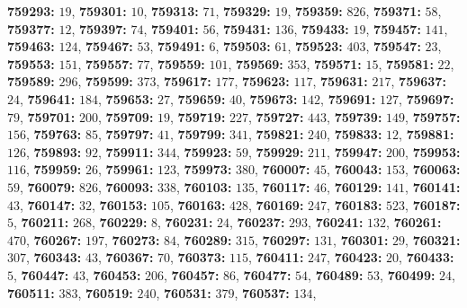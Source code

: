 \textsf{\bfseries 759293:} $19$, \textsf{\bfseries 759301:} $10$, \textsf{\bfseries 759313:} $71$, \textsf{\bfseries 759329:} $19$, \textsf{\bfseries 759359:} $826$, \textsf{\bfseries 759371:} $58$, \textsf{\bfseries 759377:} $12$, \textsf{\bfseries 759397:} $74$, \textsf{\bfseries 759401:} $56$, \textsf{\bfseries 759431:} $136$, \textsf{\bfseries 759433:} $19$, \textsf{\bfseries 759457:} $141$, \textsf{\bfseries 759463:} $124$, \textsf{\bfseries 759467:} $53$, \textsf{\bfseries 759491:} $6$, \textsf{\bfseries 759503:} $61$, \textsf{\bfseries 759523:} $403$, \textsf{\bfseries 759547:} $23$, \textsf{\bfseries 759553:} $151$, \textsf{\bfseries 759557:} $77$, \textsf{\bfseries 759559:} $101$, \textsf{\bfseries 759569:} $353$, \textsf{\bfseries 759571:} $15$, \textsf{\bfseries 759581:} $22$, \textsf{\bfseries 759589:} $296$, \textsf{\bfseries 759599:} $373$, \textsf{\bfseries 759617:} $177$, \textsf{\bfseries 759623:} $117$, \textsf{\bfseries 759631:} $217$, \textsf{\bfseries 759637:} $24$, \textsf{\bfseries 759641:} $184$, \textsf{\bfseries 759653:} $27$, \textsf{\bfseries 759659:} $40$, \textsf{\bfseries 759673:} $142$, \textsf{\bfseries 759691:} $127$, \textsf{\bfseries 759697:} $79$, \textsf{\bfseries 759701:} $200$, \textsf{\bfseries 759709:} $19$, \textsf{\bfseries 759719:} $227$, \textsf{\bfseries 759727:} $443$, \textsf{\bfseries 759739:} $149$, \textsf{\bfseries 759757:} $156$, \textsf{\bfseries 759763:} $85$, \textsf{\bfseries 759797:} $41$, \textsf{\bfseries 759799:} $341$, \textsf{\bfseries 759821:} $240$, \textsf{\bfseries 759833:} $12$, \textsf{\bfseries 759881:} $126$, \textsf{\bfseries 759893:} $92$, \textsf{\bfseries 759911:} $344$, \textsf{\bfseries 759923:} $59$, \textsf{\bfseries 759929:} $211$, \textsf{\bfseries 759947:} $200$, \textsf{\bfseries 759953:} $116$, \textsf{\bfseries 759959:} $26$, \textsf{\bfseries 759961:} $123$, \textsf{\bfseries 759973:} $380$, \textsf{\bfseries 760007:} $45$, \textsf{\bfseries 760043:} $153$, \textsf{\bfseries 760063:} $59$, \textsf{\bfseries 760079:} $826$, \textsf{\bfseries 760093:} $338$, \textsf{\bfseries 760103:} $135$, \textsf{\bfseries 760117:} $46$, \textsf{\bfseries 760129:} $141$, \textsf{\bfseries 760141:} $43$, \textsf{\bfseries 760147:} $32$, \textsf{\bfseries 760153:} $105$, \textsf{\bfseries 760163:} $428$, \textsf{\bfseries 760169:} $247$, \textsf{\bfseries 760183:} $523$, \textsf{\bfseries 760187:} $5$, \textsf{\bfseries 760211:} $268$, \textsf{\bfseries 760229:} $8$, \textsf{\bfseries 760231:} $24$, \textsf{\bfseries 760237:} $293$, \textsf{\bfseries 760241:} $132$, \textsf{\bfseries 760261:} $470$, \textsf{\bfseries 760267:} $197$, \textsf{\bfseries 760273:} $84$, \textsf{\bfseries 760289:} $315$, \textsf{\bfseries 760297:} $131$, \textsf{\bfseries 760301:} $29$, \textsf{\bfseries 760321:} $307$, \textsf{\bfseries 760343:} $43$, \textsf{\bfseries 760367:} $70$, \textsf{\bfseries 760373:} $115$, \textsf{\bfseries 760411:} $247$, \textsf{\bfseries 760423:} $20$, \textsf{\bfseries 760433:} $5$, \textsf{\bfseries 760447:} $43$, \textsf{\bfseries 760453:} $206$, \textsf{\bfseries 760457:} $86$, \textsf{\bfseries 760477:} $54$, \textsf{\bfseries 760489:} $53$, \textsf{\bfseries 760499:} $24$, \textsf{\bfseries 760511:} $383$, \textsf{\bfseries 760519:} $240$, \textsf{\bfseries 760531:} $379$, \textsf{\bfseries 760537:} $134$, 
